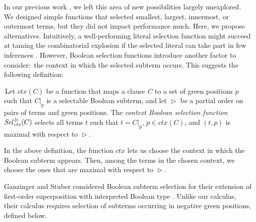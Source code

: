 \documentclass[smallcondensed,draft]{svjour3}     %
\begin{document}
In our previous work \cite{nbtv-2021-foboolsup}, we left this area of new
possibilities largely unexplored. We designed simple functions that selected
smallest, largest, innermost, or outermost terms, but they did not impact
performance much. Here, we propose alternatives.
%
Intuitively, a well-performing literal selection
function might succeed at taming the combinatorial explosion if the
selected literal can take part in few inferences
\cite{hrsv-16-selsel}. However, Boolean selection functions
introduce another factor to consider:\ the context in which the selected
subterm occurs. This suggests the following definition:

\begin{defi}
  \label{def:context-bool-sel}
  \,Let $\mathit{ctx}(C)$ be a function that maps a clause $C$ to a set of green positions
  $p$ such that $C|_p$ is a selectable Boolean subterm, and let
  $\vartriangleright$ be a partial order on pairs of terms and green positions.
  The \emph{context
  Boolean selection function} $\mathit{Sel\/}_{\mathit{ctx}}^{\,\vartriangleright}(C)$
  selects all terms $t$ such that $t=C|_p$, $p \in \mathit{ctx}(C)$, and
  $(t,p)$ is maximal with respect to $\vartriangleright$.
\end{defi}

In the above definition, the function $\mathit{ctx}$ lets
us choose the context in which the Boolean subterm appears. Then, among
the terms in the chosen context, we choose the ones that are maximal with
respect to $\vartriangleright$.

Ganzinger and Stuber considered Boolean subterm selection for their extension of
first-order superposition with interpreted Boolean type \cite{gs-05-boolsup}. Unlike our calculus, their calculus requires
selection of subterms occurring in negative green positions, defined below.
\end{document}

